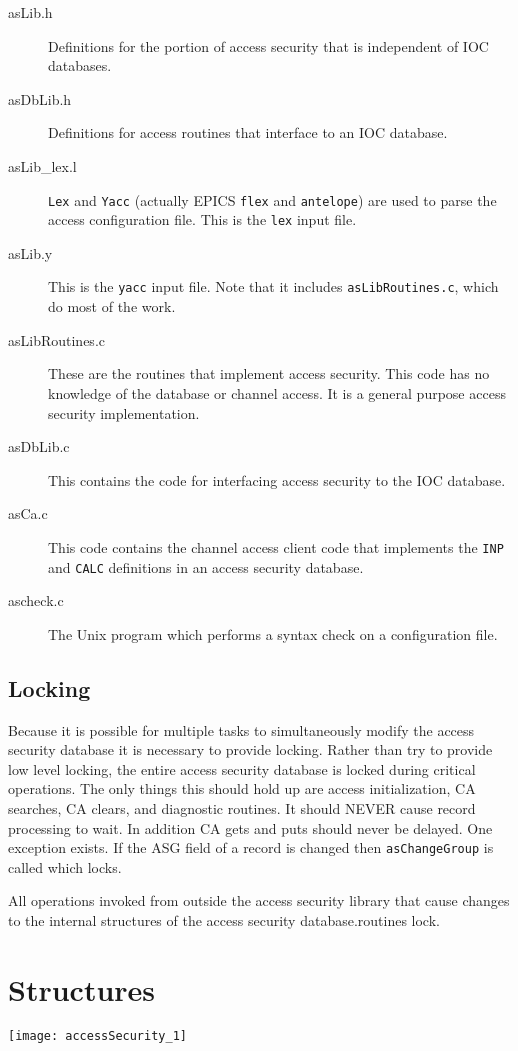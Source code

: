 \begin{description}
\item[asLib.h]

Definitions for the portion of access security that is independent of IOC databases.

\item[asDbLib.h]

Definitions for access routines that interface to an IOC database.

\item[asLib\_lex.l]

\verb|Lex| and \verb|Yacc| (actually EPICS \verb|flex| and \verb|antelope|) are used to parse the access configuration file. This is the \verb|lex| input file.

\item[asLib.y]

This is the \verb|yacc| input file. Note that it includes \verb|asLibRoutines.c|, which do most of the work.

\item[asLibRoutines.c]

These are the routines that implement access security. This code has no knowledge of the database or channel access. It is a general purpose access security implementation.

\item[asDbLib.c]

This contains the code for interfacing access security to the IOC database.

\item[asCa.c]

This code contains the channel access client code that implements the \verb|INP| and \verb|CALC| definitions in an access security database.

\item[ascheck.c]

The Unix program which performs a syntax check on a configuration file.
\end{description}

\subsection{Locking}

Because it is possible for multiple tasks to simultaneously modify the access security database it is necessary to provide 
locking. Rather than try to provide low level locking, the entire access security database is locked during critical 
operations. The only things this should hold up are access initialization, CA searches, CA clears, and diagnostic routines. 
It should NEVER cause record processing to wait. In addition CA gets and puts should never be delayed. One exception 
exists. If the ASG field of a record is changed then \verb|asChangeGroup| is called which locks.

All operations invoked from outside the access security library that cause changes to the internal structures of the access 
security database.routines lock.

\newpage

\section{Structures}

\begin{center}
\texttt{[image: accessSecurity\_1]}
\end{center}
